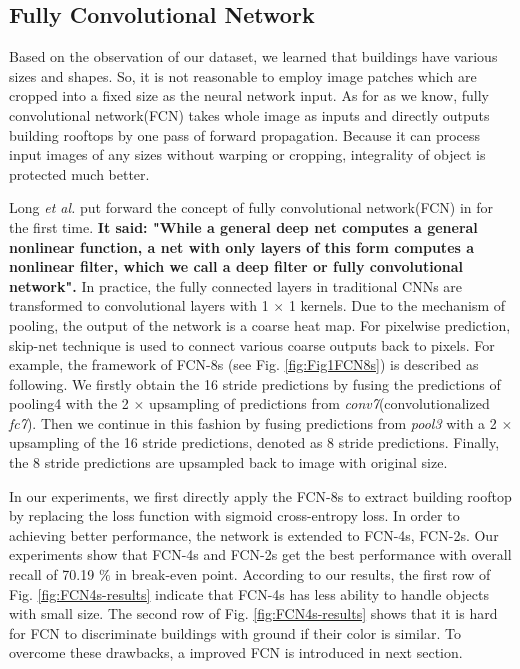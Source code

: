 \documentclass[runningheads]{llncs}
\begin{document}
\subsection{Fully Convolutional Network}
	Based on the observation of our dataset, we learned that buildings have various sizes and shapes. So, it is not reasonable to employ image patches which are cropped into a fixed size as the neural network input. As for as we know, fully convolutional network(FCN) takes whole image as inputs and directly outputs building rooftops by one pass of forward propagation. Because it can process input images of any sizes without warping or cropping, integrality of object is protected much better.
	
	 Long  \textit{et al.} put forward the concept of fully convolutional network(FCN) in \cite{Long2014Fully} for the first time. \textbf{It said: "While a general deep net computes a general nonlinear function, a net with only layers of this form computes a nonlinear filter, which we call a deep filter or fully convolutional network".} In practice, the fully connected layers in traditional CNNs are transformed to convolutional layers with 1 $\times$ 1 kernels. Due to the mechanism of pooling, the output of the network is a coarse heat map. For pixelwise prediction, skip-net technique is used to connect various coarse outputs back to pixels.  For example, the framework of FCN-8s (see Fig. \ref{fig:Fig1FCN8s}) is described as following. We firstly obtain the 16 stride predictions by fusing the predictions of pooling4 with the 2 $\times$ upsampling of predictions from \textit{conv7}(convolutionalized \textit{fc7}). Then we continue in this fashion by fusing predictions from \textit{pool3} with a 2 $\times$ upsampling of the 16 stride predictions, denoted as 8 stride predictions. Finally, the 8 stride predictions are upsampled back to image with original size. 
	 
	 In our experiments, we first directly apply the FCN-8s to extract building rooftop by replacing the loss function with sigmoid cross-entropy loss. In order to achieving better performance, the network is extended to FCN-4s, FCN-2s. Our experiments show that FCN-4s and FCN-2s get the best performance with overall recall of 70.19 $\%$ in break-even point. According to our results, the first row of Fig. \ref{fig:FCN4s-results} indicate that FCN-4s has less ability to handle  objects with small size. The second row of Fig. \ref{fig:FCN4s-results} shows that it is hard for FCN to discriminate buildings with ground if their color is similar. To overcome these drawbacks, a improved FCN is introduced in next section.
	 
\end{document}
